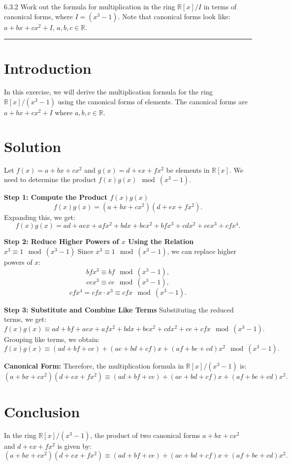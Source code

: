 \documentclass[12pt]{amsart}
\theoremstyle{definition}
\numberwithin{equation}{section}
\newcommand{\R}{\mathbb{R}}
\begin{document}
\newpage
\begin{exercise}{6.3.2} Work out the formula for multiplication in the ring \( \R[x]/I \) in terms of canonical forms, where \( I = (x^3 - 1) \). Note that canonical forms look like: \(a + bx + cx^2 + I\), \(a, b, c \in \R \).

    \noindent\rule{\linewidth}{1pt}

    \section*{Introduction}
    In this exercise, we will derive the multiplication formula for the ring \( \R[x]/(x^3 - 1) \) using the canonical forms of elements. The canonical forms are \(a + bx + cx^2 + I\) where \(a, b, c \in \R \).

    \section*{Solution}
    Let \(f(x) = a + bx + cx^2\) and \(g(x) = d + ex + fx^2\) be elements in \( \R[x] \). We need to determine the product \(f(x)g(x) \mod (x^3 - 1)\).

    \noindent \textbf{Step 1: Compute the Product \(f(x)g(x)\)}
    \[
    f(x)g(x) = (a + bx + cx^2)(d + ex + fx^2).
    \]
    Expanding this, we get:
    \[
    f(x)g(x) = ad + aex + afx^2 + bdx + bex^2 + bfx^3 + cdx^2 + cex^3 + cfx^4.
    \]

    \noindent \textbf{Step 2: Reduce Higher Powers of \(x\) Using the Relation \(x^3 \equiv 1 \mod (x^3 - 1)\)}
    Since \(x^3 \equiv 1 \mod (x^3 - 1)\), we can replace higher powers of \(x\):
    \[
    bfx^3 \equiv bf \mod (x^3 - 1),
    \]
    \[
    cex^3 \equiv ce \mod (x^3 - 1),
    \]
    \[
    cfx^4 = cfx \cdot x^3 \equiv cfx \mod (x^3 - 1).
    \]

    \noindent \textbf{Step 3: Substitute and Combine Like Terms}
    Substituting the reduced terms, we get:
    \[
    f(x)g(x) \equiv ad + bf + aex + afx^2 + bdx + bex^2 + cdx^2 + ce + cfx \mod (x^3 - 1).
    \]
    Grouping like terms, we obtain:
    \[
    f(x)g(x) \equiv (ad + bf + ce) + (ae + bd + cf)x + (af + be + cd)x^2 \mod (x^3 - 1).
    \]

    \noindent \textbf{Canonical Form:}
    Therefore, the multiplication formula in \( \R[x]/(x^3 - 1) \) is:
    \[
    (a + bx + cx^2)(d + ex + fx^2) \equiv (ad + bf + ce) + (ae + bd + cf)x + (af + be + cd)x^2.
    \]

    \section*{Conclusion}
    In the ring \( \R[x]/(x^3 - 1) \), the product of two canonical forms \(a + bx + cx^2\) and \(d + ex + fx^2\) is given by:
    \[
    (a + bx + cx^2)(d + ex + fx^2) \equiv (ad + bf + ce) + (ae + bd + cf)x + (af + be + cd)x^2.
    \]

\end{exercise}
\end{document}
